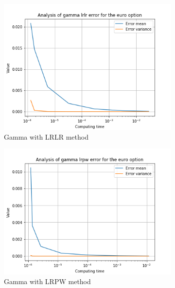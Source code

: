 \documentclass[12pt,a4paper,fleqn]{article}
\begin{document}
\begin{figure}
      \begin{subfigure}[b]{0.3\textwidth}
          \includegraphics[width=\textwidth]{graphs/eurogammalrlrtime.png}
          \caption{Gamma with LRLR method}
      \end{subfigure}
      \begin{subfigure}[b]{0.3\textwidth}
          \includegraphics[width=\textwidth]{graphs/eurogammalrpwtime.png}
          \caption{Gamma with LRPW method}
      \end{subfigure}
      \begin{subfigure}[b]{0.3\textwidth}

\end{subfigure}
\end{figure}
\end{document}
